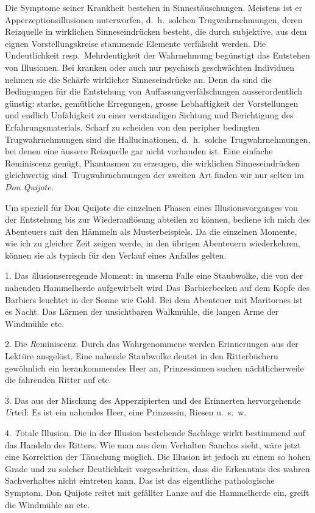 Die Symptome seiner Krankheit bestehen in Sinnestäuschungen.
Meistens ist er Apperzeptionsillusionen unterworfen, d.~h.\ solchen
Trugwahrnehmungen, deren Reizquelle in wirklichen Sinneseindrücken besteht,
die durch subjektive, aus dem eignen Vorstellungskreise stammende
Elemente verfälscht werden. Die Undeutlichkeit resp.\ Mehrdeutigkeit
der Wahrnehmung begünstigt das Entstehen von Illusionen. Bei
kranken oder auch nur psychisch geschwächten Individuen nehmen sie
die Schärfe wirklicher Sinneseindrücke an. Denn da sind die
Bedingungen für die Entstehung von Auffassungverfälschungen ausserordentlich
günstig: starke, gemütliche Erregungen, grosse Lebhaftigkeit
der Vorstellungen und endlich Unfähigkeit zu einer verständigen
Sichtung und Berichtigung des Erfahrungsmaterials. Scharf zu scheiden
von den peripher bedingten Trugwahrnehmungen sind die Hallucinationen,
d.~h.\ solche Trugwahrnehmungen, bei denen eine äussere Reizquelle
gar nicht vorhanden ist. Eine einfache Reminiscenz genügt, Phantasmen
zu erzeugen, die wirklichen Sinneseindrücken gleichwertig sind.
Trugwahrnehmungen der zweiten Art finden wir nur selten im {\it Don Quijote.}

Um speziell für Don Quijote die einzelnen Phasen eines Illusionsvorganges
von der Entstehung bis zur Wiederauflösung abteilen zu
können, bediene ich mich des Abenteuers mit den Hämmeln als
Musterbeispiels. Da die einzelnen Momente, wie ich zu gleicher Zeit
zeigen werde, in den übrigen Abenteuern wiederkehren, können sie als
typisch für den Verlauf eines Anfalles gelten.

1. Das {\emph illusionserregende Moment}: in unserm Falle eine
Staubwolke, die von der nahenden Hammelherde aufgewirbelt wird
Das~Barbierbecken auf dem Kopfe des Barbiers leuchtet in der Sonne wie
Gold. Bei dem Abenteuer mit Maritornes ist es Nacht. Das Lärmen
der unsichtbaren Walkmühle, die langen Arme der Windmühle etc.

2. Die {\emph Reminiscenz}. Durch das Wahrgenommene werden Erinnerungen
aus der Lektüre ausgelöst. Eine nahende Staubwolke
deutet in den Ritterbüchern gewöhnlich ein herankommendes Heer an,
Prinzessinnen suchen nächtlicherweile die fahrenden Ritter auf etc.

3. Das aus der Mischung des Apperzipierten und des Erinnerten
hervorgehende {\emph Urteil}: Es ist ein nahendes Heer, eine Prinzessin,
Riesen u.~s.~w.

4. {\emph Totale Illusion}. Die in der Illusion bestehende Sachlage
wirkt bestimmend auf das Handeln des Ritters. Wie man aus dem
Verhalten Sanchos sieht, wäre jetzt eine Korrektion der Täuschung
möglich. Die Illusion ist jedoch zu einem so hohen Grade und zu
solcher Deutlichkeit vorgeschritten, dass die Erkenntnis des wahren
Sachverhaltes nicht eintreten kann. Das ist das eigentliche pathologische
Symptom. Don Quijote reitet mit gefällter Lanze auf die Hammelherde
ein, greift die Windmühle an etc.

